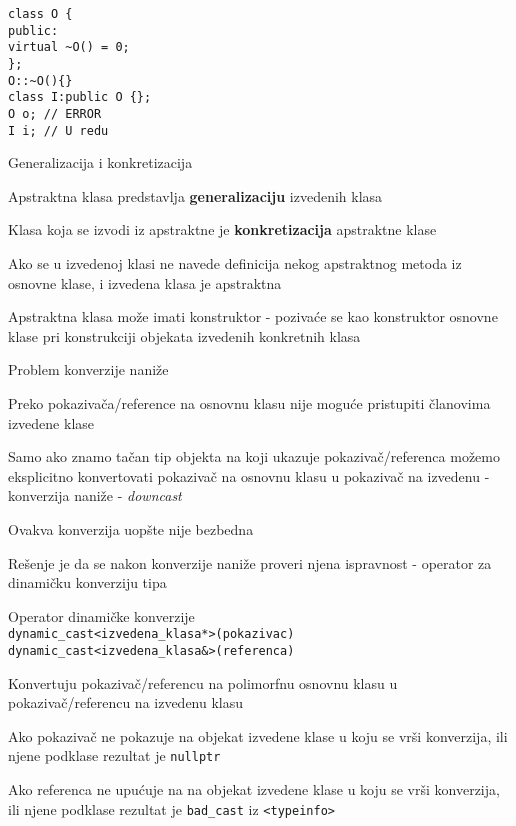 \documentclass{article}
\newenvironment{xitemize}{%
    
    \itemize
    \larger
}{%
    \enditemize
}
\let\olditemize\itemize
\let\endolditemize\enditemize
\renewenvironment{itemize}{%
    \smaller
    \olditemize
}{%
    \endolditemize
}
\providecommand{\inlinecode}[1]{\texttt{#1}}
\begin{document}
\begin{xitemize}
\begin{itemize}
    \begin{lstlisting}
class O {
public:
virtual ~O() = 0;
};
O::~O(){}
class I:public O {};
O o; // ERROR
I i; // U redu
    \end{lstlisting}
\end{itemize}
\item Generalizacija i konkretizacija
\begin{itemize}
    \item Apstraktna klasa predstavlja \textbf{generalizaciju} izvedenih klasa
    \item Klasa koja se izvodi iz apstraktne je \textbf{konkretizacija} apstraktne klase
    \item Ako se u izvedenoj klasi ne navede definicija nekog apstraktnog metoda iz osnovne klase, i izvedena klasa je apstraktna
    \item Apstraktna klasa može imati konstruktor - pozivaće se kao konstruktor osnovne klase pri konstrukciji objekata izvedenih konkretnih klasa
\end{itemize}
\item Problem konverzije naniže
\begin{itemize}
    \item Preko pokazivača/reference na osnovnu klasu nije moguće pristupiti članovima izvedene klase
    \item Samo ako znamo tačan tip objekta na koji ukazuje pokazivač/referenca možemo eksplicitno konvertovati pokazivač na osnovnu klasu u pokazivač na izvedenu - konverzija naniže - \textit{downcast}
    \item Ovakva konverzija uopšte nije bezbedna
    \item Rešenje je da se nakon konverzije naniže proveri njena ispravnost - operator za dinamičku konverziju tipa
\end{itemize}
\item Operator dinamičke konverzije\\
\inlinecode{dynamic\_cast<izvedena\_klasa*>(pokazivac)\\}
\inlinecode{dynamic\_cast<izvedena\_klasa\&>(referenca)}
\begin{itemize}
    \item Konvertuju pokazivač/referencu na polimorfnu osnovnu klasu u pokazivač/referencu na izvedenu klasu
    \item Ako pokazivač ne pokazuje na objekat izvedene klase u koju se vrši konverzija, ili njene podklase rezultat je \inlinecode{nullptr}
    \item Ako referenca ne upućuje na na objekat izvedene klase u koju se vrši konverzija, ili njene podklase rezultat je  \inlinecode{bad\_cast} iz \inlinecode{<typeinfo>}
    

\end{itemize}
\end{xitemize}
\end{document}
